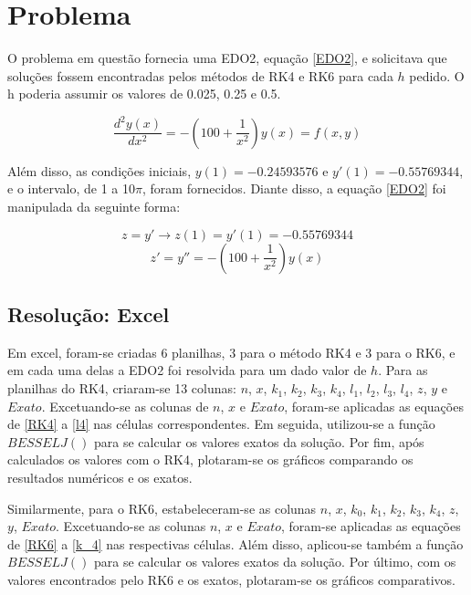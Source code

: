 \documentclass[a4paper,11pt]{article}
\begin{document}
\pagebreak

\section{Problema}

    O problema em questão fornecia uma EDO2, equação \ref{EDO2}, e solicitava que soluções fossem encontradas pelos métodos de RK4 e RK6 para cada $h$ pedido. O h poderia assumir os valores de 0.025, 0.25 e 0.5.
    
    \begin{equation}
        \label{EDO2}
        \frac{d^2y(x)}{dx^2}=-\left(100+\frac{1}{x^2}\right)y(x)=f(x,y)
    \end{equation}
    
    Além disso, as condições iniciais, $y(1)=-0.24593576$ e $y'(1)=-0.55769344$, e o intervalo, de 1 a 10$\pi$, foram fornecidos. Diante disso, a equação \ref{EDO2} foi manipulada da seguinte forma:
    
    \begin{equation}
        \label{z}
        z=y' \rightarrow z(1)=y'(1)=-0.55769344
    \end{equation}
    \begin{equation}
        \label{y}
        z'=y''=-\left(100+\frac{1}{x^2}\right)y(x)
    \end{equation}
    
\subsection{Resolução: Excel}

    Em excel, foram-se criadas 6 planilhas, 3 para o método RK4 e 3 para o RK6, e em cada uma delas a EDO2 foi resolvida para um dado valor de $h$. Para as planilhas do RK4, criaram-se 13 colunas: $n$, $x$, $k_1$, $k_2$, $k_3$, $k_4$, $l_1$, $l_2$, $l_3$, $l_4$, $z$, $y$ e $Exato$. Excetuando-se as colunas de $n$, $x$ e $Exato$, foram-se aplicadas as equações de \ref{RK4} a \ref{l4} nas células correspondentes. Em seguida, utilizou-se a função $BESSELJ()$ para se calcular os valores exatos da solução. Por fim, após calculados os valores com o RK4, plotaram-se os gráficos comparando os resultados numéricos e os exatos. 
    
    Similarmente, para o RK6, estabeleceram-se as colunas $n$, $x$, $k_0$, $k_1$, $k_2$, $k_3$, $k_4$, $z$, $y$, $Exato$. Excetuando-se as colunas $n$, $x$ e $Exato$, foram-se aplicadas as equações de \ref{RK6} a \ref{k_4} nas respectivas células. Além disso, aplicou-se também a função $BESSELJ()$ para se calcular os valores exatos da solução. Por último, com os valores encontrados pelo RK6 e os exatos, plotaram-se os gráficos comparativos.
\end{document}
